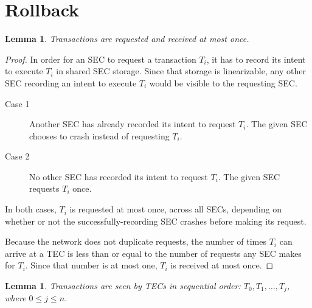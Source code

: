 \documentclass{article}
\newtheorem{lemma}[theorem]{Lemma}
\begin{document}
\section{Rollback}

\begin{lemma}
\label{t_at_most_once}
Transactions are requested and received at most once.
\end{lemma}

\begin{proof}

In order for an SEC to request a transaction $T_i$, it has to record its intent
to execute $T_i$ in shared SEC storage. Since that storage is linearizable, any
other SEC recording an intent to execute $T_i$ would be visible to the
requesting SEC.

\begin{description}
  \item[Case 1] Another SEC has already recorded its intent to request $T_i$.
The given SEC chooses to crash instead of requesting $T_i$.
  \item[Case 2] No other SEC has recorded its intent to request $T_i$. The
given SEC requests $T_i$ once.
\end{description}

In both cases, $T_i$ is requested at most once, across all SECs, depending on
whether or not the successfully-recording SEC crashes before making its
request.

Because the network does not duplicate requests, the number of times $T_i$ can
arrive at a TEC is less than or equal to the number of requests any SEC makes
for $T_i$. Since that number is at most one, $T_i$ is received at most once.

\end{proof}


\begin{lemma}
\label{t_sequential}
Transactions are seen by TECs in sequential order: $T_0, T_1, \ldots, T_j$,
where $0 \le j \le n$.
\end{lemma}
\end{document}
